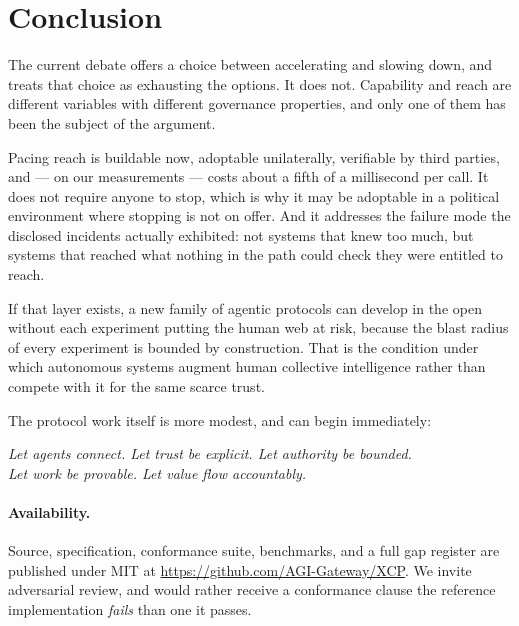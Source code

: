 \documentclass[11pt]{article}
\begin{document}
\section{Conclusion}

The current debate offers a choice between accelerating and slowing down, and
treats that choice as exhausting the options. It does not. Capability and reach
are different variables with different governance properties, and only one of
them has been the subject of the argument.

Pacing reach is buildable now, adoptable unilaterally, verifiable by third
parties, and --- on our measurements --- costs about a fifth of a millisecond per
call. It does not require anyone to stop, which is why it may be adoptable in a
political environment where stopping is not on offer. And it addresses the
failure mode the disclosed incidents actually exhibited: not systems that knew
too much, but systems that reached what nothing in the path could check they were
entitled to reach.

If that layer exists, a new family of agentic protocols can develop in the open
without each experiment putting the human web at risk, because the blast radius
of every experiment is bounded by construction. That is the condition under which
autonomous systems augment human collective intelligence rather than compete with
it for the same scarce trust.

The protocol work itself is more modest, and can begin immediately:

\begin{center}
\emph{Let agents connect. Let trust be explicit. Let authority be bounded.\\
Let work be provable. Let value flow accountably.}
\end{center}

\paragraph{Availability.} Source, specification, conformance suite, benchmarks,
and a full gap register are published under MIT at
\url{https://github.com/AGI-Gateway/XCP}. We invite adversarial review, and would
rather receive a conformance clause the reference implementation \emph{fails}
than one it passes.
\end{document}
